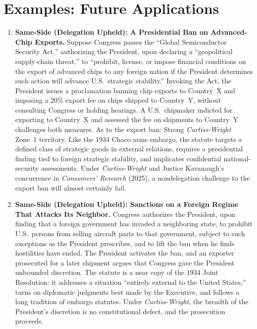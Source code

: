 \documentclass[12pt]{article}
\begin{document}
\section{Examples: Future Applications}
\begin{enumerate}

\item \textbf{Same-Side (Delegation Upheld): A Presidential Ban on Advanced-Chip Exports.} Suppose Congress passes the ``Global Semiconductor Security Act,'' authorizing the President, upon declaring a ``geopolitical supply-chain threat,'' to ``prohibit, license, or impose financial conditions on the export of advanced chips to any foreign nation if the President determines such action will advance U.S.\ strategic stability.'' Invoking the Act, the President issues a proclamation banning chip exports to Country~X and imposing a 20\% export fee on chips shipped to Country~Y, without consulting Congress or holding hearings. A U.S.\ chipmaker indicted for exporting to Country~X and assessed the fee on shipments to Country~Y challenges both measures. As to the export ban: Strong \textit{Curtiss-Wright} Zone~1 territory. Like the 1934 Chaco arms embargo, the statute targets a defined class of strategic goods in external relations, requires a presidential finding tied to foreign strategic stability, and implicates confidential national-security assessments. Under \textit{Curtiss-Wright} and Justice Kavanaugh's concurrence in \textit{Consumers' Research} (2025), a nondelegation challenge to the export ban will almost certainly fail.

\item \textbf{Same-Side (Delegation Upheld): Sanctions on a Foreign Regime That Attacks Its Neighbor.} Congress authorizes the President, upon finding that a foreign government has invaded a neighboring state, to prohibit U.S.\ persons from selling aircraft parts to that government, subject to such exceptions as the President prescribes, and to lift the ban when he finds hostilities have ended. The President activates the ban, and an exporter prosecuted for a later shipment argues that Congress gave the President unbounded discretion. The statute is a near copy of the 1934 Joint Resolution: it addresses a situation ``entirely external to the United States,'' turns on diplomatic judgments best made by the Executive, and follows a long tradition of embargo statutes. Under \textit{Curtiss-Wright}, the breadth of the President's discretion is no constitutional defect, and the prosecution proceeds.


\end{enumerate}
\end{document}
